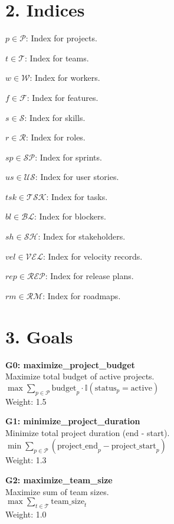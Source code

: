 \documentclass[12pt]{article}
\begin{document}
\section{2. Indices}
\item $p \in \mathcal{P}$: Index for projects.
    \item $t \in \mathcal{T}$: Index for teams.
    \item $w \in \mathcal{W}$: Index for workers.
    \item $f \in \mathcal{F}$: Index for features.
    \item $s \in \mathcal{S}$: Index for skills.
    \item $r \in \mathcal{R}$: Index for roles.
    \item $sp \in \mathcal{SP}$: Index for sprints.
    \item $us \in \mathcal{US}$: Index for user stories.
    \item $tsk \in \mathcal{TSK}$: Index for tasks.
    \item $bl \in \mathcal{BL}$: Index for blockers.
    \item $sh \in \mathcal{SH}$: Index for stakeholders.
    \item $vel \in \mathcal{VEL}$: Index for velocity records.
    \item $rep \in \mathcal{REP}$: Index for release plans.
    \item $rm \in \mathcal{RM}$: Index for roadmaps.

\section{3. Goals}
\item \textbf{G0: maximize\_project\_budget} \\
    Maximize total budget of active projects. \\
    $\max \sum_{p \in \mathcal{P}} \text{budget}_p \cdot \mathbb{I}(\text{status}_p = \text{active})$ \\
    Weight: 1.5

    \item \textbf{G1: minimize\_project\_duration} \\
    Minimize total project duration (end - start). \\
    $\min \sum_{p \in \mathcal{P}} (\text{project\_end}_p - \text{project\_start}_p)$ \\
    Weight: 1.3

    \item \textbf{G2: maximize\_team\_size} \\
    Maximize sum of team sizes. \\
    $\max \sum_{t \in \mathcal{T}} \text{team\_size}_t$ \\
    Weight: 1.0
\end{document}
